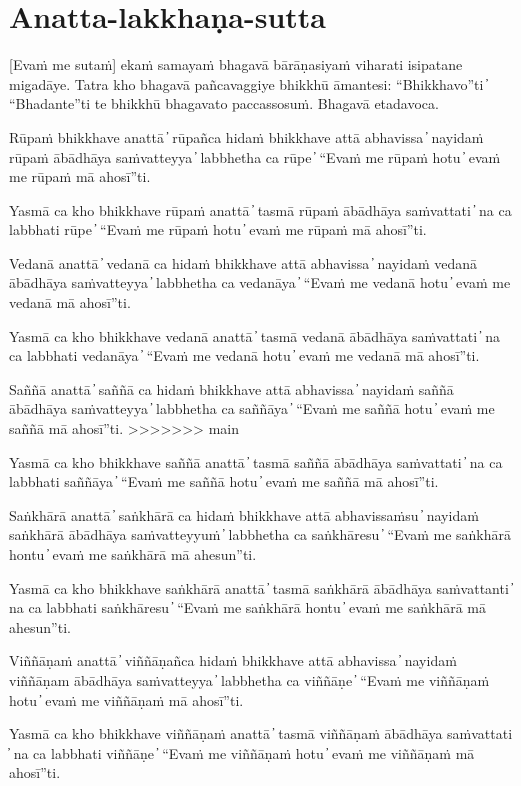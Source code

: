 \section{Anatta-lakkhaṇa-sutta}

[Evaṁ me sutaṁ] ekaṁ samayaṁ bhagavā bārāṇasiyaṁ viharati isipatane migadāye. Tatra kho bhagavā pañcavaggiye bhikkhū āmantesi: “Bhikkhavo”ti  ̓  “Bhadante”ti te bhikkhū bhagavato paccassosuṁ. Bhagavā etadavoca.

Rūpaṁ bhikkhave anattā  ̓  rūpañca hidaṁ bhikkhave attā abhavissa  ̓  nayidaṁ rūpaṁ ābādhāya saṁvatteyya  ̓  labbhetha ca rūpe  ̓  “Evaṁ me rūpaṁ hotu  ̓  evaṁ me rūpaṁ mā ahosī”ti.

Yasmā ca kho bhikkhave rūpaṁ anattā  ̓  tasmā rūpaṁ ābādhāya saṁvattati  ̓  na ca labbhati rūpe  ̓  “Evaṁ me rūpaṁ hotu  ̓  evaṁ me rūpaṁ mā ahosī”ti.

Vedanā anattā  ̓  vedanā ca hidaṁ bhikkhave attā abhavissa  ̓  nayidaṁ vedanā ābādhāya saṁvatteyya  ̓  labbhetha ca vedanāya  ̓  “Evaṁ me vedanā hotu  ̓  evaṁ me vedanā mā ahosī”ti.

Yasmā ca kho bhikkhave vedanā anattā  ̓  tasmā vedanā ābādhāya saṁvattati  ̓  na ca labbhati vedanāya  ̓  “Evaṁ me vedanā hotu  ̓  evaṁ me vedanā mā ahosī”ti.

Saññā anattā  ̓  saññā ca hidaṁ bhikkhave attā abhavissa  ̓  nayidaṁ saññā ābādhāya saṁvatteyya  ̓  labbhetha ca saññāya  ̓  “Evaṁ me saññā hotu  ̓  evaṁ me saññā mā ahosī”ti.
>>>>>>> main

Yasmā ca kho bhikkhave saññā anattā  ̓  tasmā saññā ābādhāya saṁvattati  ̓  na ca labbhati saññāya  ̓  “Evaṁ me saññā hotu  ̓  evaṁ me saññā mā ahosī”ti.

Saṅkhārā anattā  ̓  saṅkhārā ca hidaṁ bhikkhave attā abhavissaṁsu  ̓  nayidaṁ saṅkhārā ābādhāya saṁvatteyyuṁ  ̓  labbhetha ca saṅkhāresu  ̓  “Evaṁ me saṅkhārā hontu  ̓  evaṁ me saṅkhārā mā ahesun”ti.

Yasmā ca kho bhikkhave saṅkhārā anattā  ̓  tasmā saṅkhārā ābādhāya saṁvattanti  ̓  na ca labbhati saṅkhāresu  ̓  “Evaṁ me saṅkhārā hontu  ̓  evaṁ me saṅkhārā mā ahesun”ti.

Viññāṇaṁ anattā  ̓  viññāṇañca hidaṁ bhikkhave attā abhavissa  ̓  nayidaṁ viññāṇam ābādhāya saṁvatteyya  ̓  labbhetha ca viññāṇe  ̓  “Evaṁ me viññāṇaṁ hotu  ̓  evaṁ me viññāṇaṁ mā ahosī”ti.

Yasmā ca kho bhikkhave viññāṇaṁ anattā  ̓  tasmā viññāṇaṁ ābādhāya saṁvattati  ̓  na ca labbhati viññāṇe  ̓  “Evaṁ me viññāṇaṁ hotu  ̓  evaṁ me viññāṇaṁ mā ahosī”ti.

